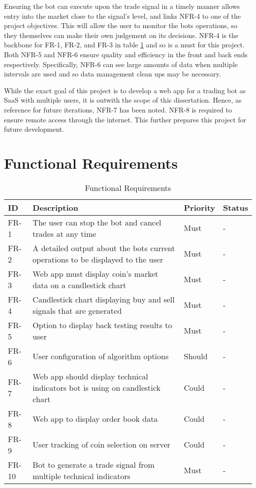 Ensuring the bot can execute upon the trade signal in a timely manner allows entry into the market close to the signal's level, and links NFR-4 to one of the project objectives. This will allow the user to monitor the bots operations, so they themselves can make their own judgement on its decisions. NFR-4 is the backbone for FR-1, FR-2, and FR-3 in table \ref{table:requirements:func} and so is a must for this project. Both NFR-5 and NFR-6 ensure quality and efficiency in the front and back ends respectively. Specifically, NFR-6 can see large amounts of data when multiple intervals are used and so data management clean ups may be necessary.

While the exact goal of this project is to develop a web app for a trading bot as SaaS with multiple users, it is outwith the scope of this dissertation. Hence, as reference for future iterations, NFR-7 has been noted. NFR-8 is required to ensure remote access through the internet. This further prepares this project for future development.



\section{Functional Requirements}
\label{sec:requirements:unc}



\begin{table}[htb!]
\caption{Functional Requirements}
\label{table:requirements:func}
\centering
\begin{tabular}{|l|p{}|l|l|}
\hline
\textbf{ID} & \textbf{Description} & \textbf{Priority} & \textbf{Status} \\ \hline\hline
FR-1 & The user can stop the bot and cancel trades at any time & Must & - \\ \hline
FR-2 & A detailed output about the bots current operations to be displayed to the user & Must & - \\ \hline
FR-3 & Web app must display coin's market data on a candlestick chart & Must & - \\\hline
FR-4 & Candlestick chart displaying buy and sell signals that are generated & Must & - \\\hline
FR-5 & Option to display back testing results to user & Must & - \\ \hline
FR-6 & User configuration of algorithm options & Should & - \\ \hline
FR-7 & Web app should display technical indicators bot is using on candlestick chart & Could & - \\\hline
FR-8 & Web app to display order book data & Could & - \\\hline
FR-9 & User tracking of coin selection on server & Could & - \\ \hline
FR-10 & Bot to generate a trade signal from multiple technical indicators & Must & - \\ \hline
\end{tabular}
\end{table}


